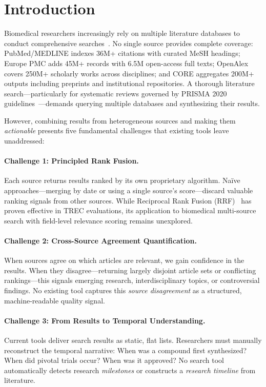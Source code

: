 \documentclass[11pt,a4paper]{article}
\begin{document}
\section{Introduction}
\label{sec:introduction}

Biomedical researchers increasingly rely on multiple literature databases to conduct comprehensive searches~\citep{lu2011pubmed}.
No single source provides complete coverage: PubMed/MEDLINE indexes 36M+ citations with curated MeSH headings; Europe PMC adds 45M+ records with 6.5M open-access full texts; OpenAlex covers 250M+ scholarly works across disciplines; and CORE aggregates 200M+ outputs including preprints and institutional repositories.
A thorough literature search---particularly for systematic reviews governed by PRISMA 2020 guidelines~\citep{page2021prisma}---demands querying multiple databases and synthesizing their results.

However, combining results from heterogeneous sources and making them \emph{actionable} presents five fundamental challenges that existing tools leave unaddressed:

\paragraph{Challenge 1: Principled Rank Fusion.}
Each source returns results ranked by its own proprietary algorithm.
Na\"ive approaches---merging by date or using a single source's score---discard valuable ranking signals from other sources.
While Reciprocal Rank Fusion (RRF)~\citep{cormack2009rrf} has proven effective in TREC evaluations, its application to biomedical multi-source search with field-level relevance scoring remains unexplored.

\paragraph{Challenge 2: Cross-Source Agreement Quantification.}
When sources agree on which articles are relevant, we gain confidence in the results.
When they disagree---returning largely disjoint article sets or conflicting rankings---this signals emerging research, interdisciplinary topics, or controversial findings.
No existing tool captures this \emph{source disagreement} as a structured, machine-readable quality signal.

\paragraph{Challenge 3: From Results to Temporal Understanding.}
Current tools deliver search results as static, flat lists.
Researchers must manually reconstruct the temporal narrative: When was a compound first synthesized? When did pivotal trials occur? When was it approved?
No search tool automatically detects research \emph{milestones} or constructs a \emph{research timeline} from literature.
\end{document}
